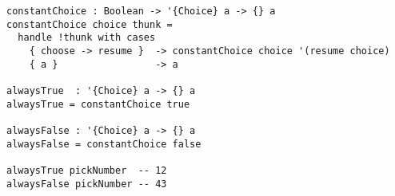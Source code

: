\begin{algorithm}

\begin{verbatim}
constantChoice : Boolean -> '{Choice} a -> {} a
constantChoice choice thunk =
  handle !thunk with cases
    { choose -> resume }  -> constantChoice choice '(resume choice)
    { a }                 -> a

alwaysTrue  : '{Choice} a -> {} a
alwaysTrue = constantChoice true

alwaysFalse : '{Choice} a -> {} a
alwaysFalse = constantChoice false
    
alwaysTrue pickNumber  -- 12
alwaysFalse pickNumber -- 43
\end{verbatim}

\caption{Effect handlers for Choice that always result in constant value. %
\label{alg-eff:choice-constant}}
\end{algorithm}
\endinput